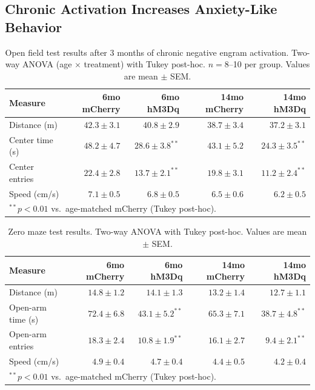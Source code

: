 \documentclass[11pt]{article}
\begin{document}
\subsection{Chronic Activation Increases Anxiety-Like Behavior}

\begin{table}[H]
\centering
\caption{Open field test results after 3 months of chronic negative engram activation. Two-way ANOVA (age $\times$ treatment) with Tukey post-hoc. $n = 8$--10 per group. Values are mean $\pm$ SEM.}
\label{tab:oft}
\begin{tabular}{lrrrr}
\toprule
\textbf{Measure} & \textbf{6mo mCherry} & \textbf{6mo hM3Dq} & \textbf{14mo mCherry} & \textbf{14mo hM3Dq} \\
\midrule
Distance (m) & $42.3 \pm 3.1$ & $40.8 \pm 2.9$ & $38.7 \pm 3.4$ & $37.2 \pm 3.1$ \\
Center time (s) & $48.2 \pm 4.7$ & $28.6 \pm 3.8^{**}$ & $43.1 \pm 5.2$ & $24.3 \pm 3.5^{**}$ \\
Center entries & $22.4 \pm 2.8$ & $13.7 \pm 2.1^{**}$ & $19.8 \pm 3.1$ & $11.2 \pm 2.4^{**}$ \\
Speed (cm/s) & $7.1 \pm 0.5$ & $6.8 \pm 0.5$ & $6.5 \pm 0.6$ & $6.2 \pm 0.5$ \\
\bottomrule
\multicolumn{5}{l}{\footnotesize $^{**}p < 0.01$ vs.\ age-matched mCherry (Tukey post-hoc).}
\end{tabular}
\end{table}

\begin{table}[H]
\centering
\caption{Zero maze test results. Two-way ANOVA with Tukey post-hoc. Values are mean $\pm$ SEM.}
\label{tab:zm}
\begin{tabular}{lrrrr}
\toprule
\textbf{Measure} & \textbf{6mo mCherry} & \textbf{6mo hM3Dq} & \textbf{14mo mCherry} & \textbf{14mo hM3Dq} \\
\midrule
Distance (m) & $14.8 \pm 1.2$ & $14.1 \pm 1.3$ & $13.2 \pm 1.4$ & $12.7 \pm 1.1$ \\
Open-arm time (s) & $72.4 \pm 6.8$ & $43.1 \pm 5.2^{**}$ & $65.3 \pm 7.1$ & $38.7 \pm 4.8^{**}$ \\
Open-arm entries & $18.3 \pm 2.4$ & $10.8 \pm 1.9^{**}$ & $16.1 \pm 2.7$ & $9.4 \pm 2.1^{**}$ \\
Speed (cm/s) & $4.9 \pm 0.4$ & $4.7 \pm 0.4$ & $4.4 \pm 0.5$ & $4.2 \pm 0.4$ \\
\bottomrule
\multicolumn{5}{l}{\footnotesize $^{**}p < 0.01$ vs.\ age-matched mCherry (Tukey post-hoc).}
\end{tabular}
\end{table}
\end{document}

